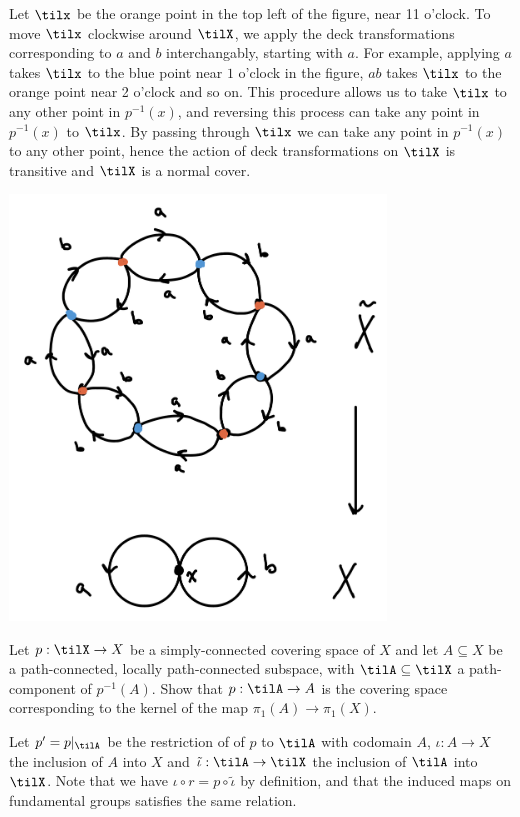 \begin{homework}[e]
\begin{prf}
    Let $\tilx$ be the orange point in the top left of the figure, near 11 o'clock. To move $\tilx$ clockwise around $\tilX$, we apply the deck transformations corresponding to $a$ and $b$ interchangably, starting with $a$. For example, applying $a$ takes $\tilx$ to the blue point near $1$ o'clock in the figure, $ab$ takes $\tilx$ to the orange point near 2 o'clock and so on. This procedure allows us to take $\tilx$ to any other point in $p^{-1}(x)$, and reversing this process can take any point in $p^{-1}(x)$ to $\tilx$. By passing through $\tilx$ we can take any point in $p^{-1}(x)$ to any other point, hence the action of deck transformations on $\tilX$ is transitive and $\tilX$ is a normal cover.
    \begin{center}
      \includegraphics[width=10cm]{figures/hwk5-fig3.jpg}
      \label{fig:12_graph}
    \end{center}
  \end{prf}
   Let $p:\tilX\to X$ be a simply-connected covering space of $X$ and let $A\subseteq X$ be a path-connected, locally path-connected subspace, with $\tilA\subseteq \tilX$ a path-component of $p^{-1}(A)$. Show that $p:\tilA\to A$ is the covering space corresponding to the kernel of the map $\pi_1(A)\to \pi_1(X)$.
  \begin{prf}
    Let $p' = p|_{\tilA}$ be the restriction of of $p$ to $\tilA$ with codomain $A$, $\iota:A\to X$ the inclusion of $A$ into $X$ and $\tilde{\iota}:\tilA\to \tilX$ the inclusion of $\tilA$ into $\tilX$. Note that we have $\iota \circ r = p\circ \tilde{\iota}$ by definition, and that the induced maps on fundamental groups satisfies the same relation.

\end{prf}
\end{homework}
